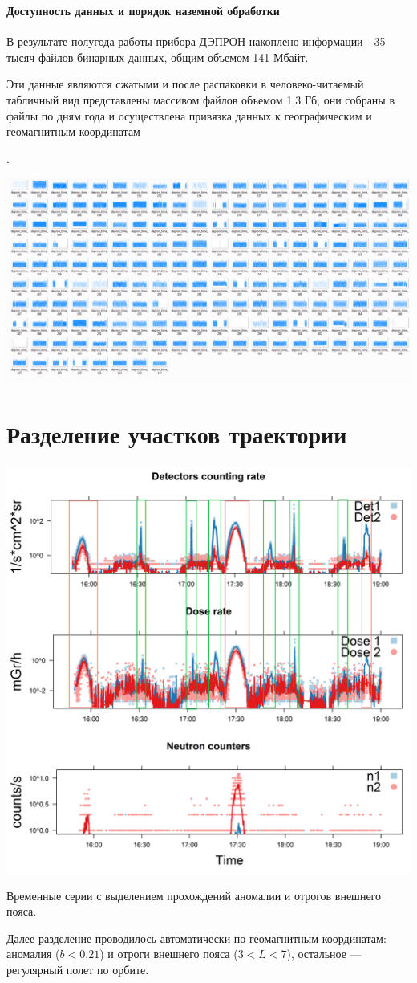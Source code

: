 \documentclass[t, aspectratio=43]{beamer}
\begin{document}
\begin{frame}	
\frametitle{\insertsection} 
\framesubtitle{Доступность данных и порядок наземной обработки}
{\tiny В результате полугода работы прибора ДЭПРОН накоплено информации - 35 тысяч файлов бинарных данных, общим объемом 141 Мбайт.

 Эти данные являются сжатыми и после распаковки в человеко-читаемый табличный вид представлены массивом файлов объемом 1,3 Гб, они собраны в файлы по дням года и осуществлена привязка данных к географическим и геомагнитным координатам}.
\begin{center}
	\includegraphics[width=1\linewidth]{images/timegraph}
\end{center}
\end{frame}

\section{Разделение участков траектории}\label{header-n0}
\begin{frame}	

\frametitle{\insertsection} 

\centering
\includegraphics[width=0.55\linewidth]{images/depronseclognew3}

{\tiny 
Временные серии с выделением прохождений аномалии и отрогов внешнего пояса.

 Далее разделение проводилось автоматически по геомагнитным координатам:\\  аномалия ($ b < 0.21 $) и отроги внешнего пояса ($ 3 < L < 7 $), остальное --- регулярный полет по орбите.}
\end{frame}
\end{document}

